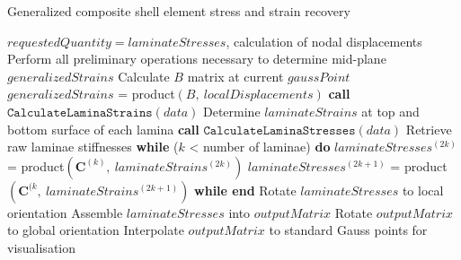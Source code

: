 \begin{algorithm}
	\onehalfspacing
	\caption{Generalized composite shell element stress and strain recovery}
	\label{general composite shell stress pseudocode}
	\begin{algorithmic}[1]
		\Require $requestedQuantity = laminateStresses$, calculation of nodal displacements
		\State Perform all preliminary operations necessary to determine mid-plane $generalizedStrains$
		\State Calculate $B$ matrix at current $gaussPoint$
		\State $generalizedStrains$ = product$(B,\ localDisplacements)$
		\State \textbf{call} $\texttt{CalculateLaminaStrains}(data)$
		\State \hspace{\algorithmicindent}Determine $laminateStrains$ at top and bottom surface of each lamina 
		\State \textbf{call} $\texttt{CalculateLaminaStresses}(data)$
		\State \hspace{\algorithmicindent}Retrieve raw laminae stiffnesses
		\State \hspace{\algorithmicindent}\textbf{while} ($k$ < number of laminae) \textbf{do}
		\State \hspace{\algorithmicindent} \hspace{\algorithmicindent}$laminateStresses^{(2k)}$ = product$(\mathbf{C}^{(k)},\ laminateStrains^{(2k)})$
		\State \hspace{\algorithmicindent} \hspace{\algorithmicindent}$laminateStresses^{(2k+1)}$ = product$(\mathbf{C}^{(k},\ laminateStrains^{(2k+1)})$
		\State \hspace{\algorithmicindent}\textbf{while end}
		\State Rotate $laminateStresses$ to local orientation
		\EndIf
		\State Assemble $laminateStresses$ into $outputMatrix$
		\State Rotate $outputMatrix$ to global orientation
		\EndIf
		\State Interpolate $outputMatrix$ to standard Gauss points for visualisation
		\EndWhile
	\end{algorithmic}
\end{algorithm}

